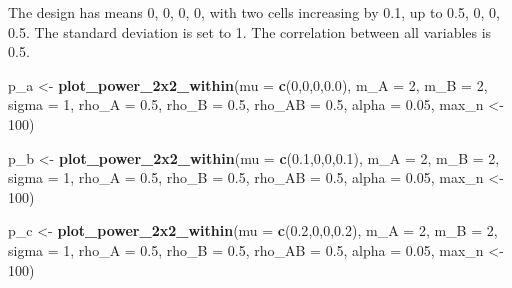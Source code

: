 \documentclass[]{article}
\newenvironment{Shaded}{\begin{snugshade}}{\end{snugshade}}
\newcommand{\KeywordTok}[1]{\textcolor[rgb]{0.13,0.29,0.53}{\textbf{#1}}}
\newcommand{\DataTypeTok}[1]{\textcolor[rgb]{0.13,0.29,0.53}{#1}}
\newcommand{\DecValTok}[1]{\textcolor[rgb]{0.00,0.00,0.81}{#1}}
\newcommand{\FloatTok}[1]{\textcolor[rgb]{0.00,0.00,0.81}{#1}}
\newcommand{\StringTok}[1]{\textcolor[rgb]{0.31,0.60,0.02}{#1}}
\newcommand{\NormalTok}[1]{#1}
\begin{document}
The design has means 0, 0, 0, 0, with two cells increasing by 0.1, up to
0.5, 0, 0, 0.5. The standard deviation is set to 1. The correlation
between all variables is 0.5.

\begin{Shaded}
\begin{Highlighting}[]
\NormalTok{p_a <-}\StringTok{ }\KeywordTok{plot_power_2x2_within}\NormalTok{(}\DataTypeTok{mu =} \KeywordTok{c}\NormalTok{(}\DecValTok{0}\NormalTok{,}\DecValTok{0}\NormalTok{,}\DecValTok{0}\NormalTok{,}\FloatTok{0.0}\NormalTok{), }
                      \DataTypeTok{m_A =} \DecValTok{2}\NormalTok{, }
                      \DataTypeTok{m_B =} \DecValTok{2}\NormalTok{, }
                      \DataTypeTok{sigma =} \DecValTok{1}\NormalTok{, }
                      \DataTypeTok{rho_A =} \FloatTok{0.5}\NormalTok{, }
                      \DataTypeTok{rho_B =} \FloatTok{0.5}\NormalTok{, }
                      \DataTypeTok{rho_AB =} \FloatTok{0.5}\NormalTok{, }
                      \DataTypeTok{alpha =} \FloatTok{0.05}\NormalTok{,}
\NormalTok{                      max_n <-}\StringTok{ }\DecValTok{100}\NormalTok{)}

\NormalTok{p_b <-}\StringTok{ }\KeywordTok{plot_power_2x2_within}\NormalTok{(}\DataTypeTok{mu =} \KeywordTok{c}\NormalTok{(}\FloatTok{0.1}\NormalTok{,}\DecValTok{0}\NormalTok{,}\DecValTok{0}\NormalTok{,}\FloatTok{0.1}\NormalTok{), }
                      \DataTypeTok{m_A =} \DecValTok{2}\NormalTok{, }
                      \DataTypeTok{m_B =} \DecValTok{2}\NormalTok{, }
                      \DataTypeTok{sigma =} \DecValTok{1}\NormalTok{, }
                      \DataTypeTok{rho_A =} \FloatTok{0.5}\NormalTok{, }
                      \DataTypeTok{rho_B =} \FloatTok{0.5}\NormalTok{, }
                      \DataTypeTok{rho_AB =} \FloatTok{0.5}\NormalTok{, }
                      \DataTypeTok{alpha =} \FloatTok{0.05}\NormalTok{,}
\NormalTok{                      max_n <-}\StringTok{ }\DecValTok{100}\NormalTok{)}

\NormalTok{p_c <-}\StringTok{ }\KeywordTok{plot_power_2x2_within}\NormalTok{(}\DataTypeTok{mu =} \KeywordTok{c}\NormalTok{(}\FloatTok{0.2}\NormalTok{,}\DecValTok{0}\NormalTok{,}\DecValTok{0}\NormalTok{,}\FloatTok{0.2}\NormalTok{), }
                      \DataTypeTok{m_A =} \DecValTok{2}\NormalTok{, }
                      \DataTypeTok{m_B =} \DecValTok{2}\NormalTok{, }
                      \DataTypeTok{sigma =} \DecValTok{1}\NormalTok{, }
                      \DataTypeTok{rho_A =} \FloatTok{0.5}\NormalTok{, }
                      \DataTypeTok{rho_B =} \FloatTok{0.5}\NormalTok{, }
                      \DataTypeTok{rho_AB =} \FloatTok{0.5}\NormalTok{, }
                      \DataTypeTok{alpha =} \FloatTok{0.05}\NormalTok{,}
\NormalTok{                      max_n <-}\StringTok{ }\DecValTok{100}\NormalTok{)}


\end{Highlighting}
\end{Shaded}
\end{document}
